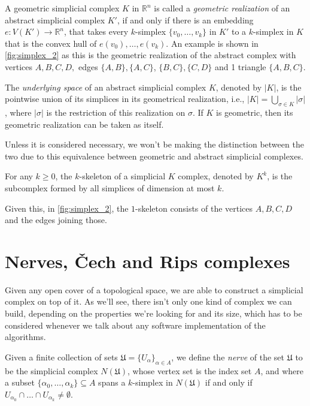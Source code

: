 \noindent
A geometric simplicial complex $K$ in $\mathbb{R}^{n}$ is called a \textit{geometric realization} of an abstract simplicial complex $K'$, if and only if there is an embedding $e: V(K') \to \mathbb{R}^{n}$, that takes every $k$-simplex $\{v_{0}, \ldots, v_{k}\}$ in $K'$ to a $k$-simplex in $K$ that is the convex hull of $e(v_{0}), \ldots, e(v_{k})$. An example is shown in \ref{fig:simplex_2} as this is the geometric realization of the abstract complex with vertices $A,B,C,D,$ edges $\{A,B\}, \{A,C\}$,
$\{B,C\}, \{C,D\}$ and 1 triangle $\{A,B,C\}$.

\begin{definition}
  The \textit{underlying space} of an abstract simplicial complex $K$, denoted by $|K|$, is the pointwise union of its simplices in its geometrical realization, i.e., $|K| = \bigcup_{\sigma \in K}|\sigma|$, where $|\sigma|$ is the restriction of this realization on $\sigma$. If $K$ is geometric, then its geometric realization can be taken as itself.
\end{definition}

Unless it is considered necessary, we won't be making the distinction between the two due to this equivalence between geometric and abstract simplicial complexes.

\begin{definition}[$k$-skeleton]
  For any $k \geq 0$, the $k$-skeleton of a simplicial $K$ complex, denoted by $K^{k}$, is the subcomplex formed by all simplices of dimension at most $k$.
\end{definition}
Given this, in \ref{fig:simplex_2}, the $1$-skeleton consists of the vertices $A,B,C,D$ and the edges joining those.

\section{Nerves, Čech and Rips complexes}
Given any open cover of a topological space, we are able to construct a simplicial complex on top of it. As we'll see, there isn't only one kind of complex we can build, depending on the properties we're looking for and its size, which has to be considered whenever we talk about any software implementation of the algorithms.

\begin{definition}[Nerve]
  Given a finite collection of sets $\mathfrak{U} = \{U_{\alpha}\}_{\alpha \in A}$, we define the \textit{nerve} of the set $\mathfrak{U}$ to be the simplicial complex $N(\mathfrak{U})$, whose vertex set is the index set $A$, and where a subset $\{\alpha_{0}, \ldots, \alpha_{k}\} \subseteq A$ spans a $k$-simplex in $N(\mathfrak{U})$ if and only if $U_{\alpha_{0}} \cap \ldots \cap U_{\alpha_{k}} \ne \emptyset$.
\end{definition}

